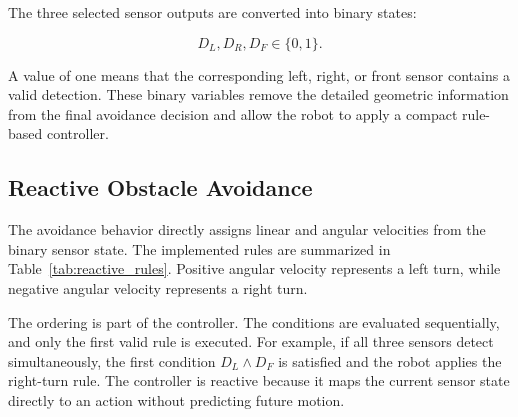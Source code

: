 \documentclass[10pt,twocolumn,a4paper]{article}
\begin{document}
The three selected sensor outputs are converted into binary states:

\begin{equation}
    D_L,D_R,D_F\in\{0,1\}.
    \label{eq:binary_sensor_states}
\end{equation}

A value of one means that the corresponding left, right, or front sensor
contains a valid detection. These binary variables remove the detailed
geometric information from the final avoidance decision and allow the
robot to apply a compact rule-based controller.

\subsection{Reactive Obstacle Avoidance}

The avoidance behavior directly assigns linear and angular velocities
from the binary sensor state. The implemented rules are summarized in
Table~\ref{tab:reactive_rules}. Positive angular velocity represents a
left turn, while negative angular velocity represents a right turn.

\begin{table}[htbp]
\centering
\caption{Priority-Ordered Reactive Avoidance Rules.}
\label{tab:reactive_rules}
\small
{}
\end{table}

The ordering is part of the controller. The conditions are evaluated
sequentially, and only the first valid rule is executed. For example, if
all three sensors detect simultaneously, the first condition
$D_L\land D_F$ is satisfied and the robot applies the right-turn rule.
The controller is reactive because it maps the current sensor state
directly to an action without predicting future motion.
\end{document}
